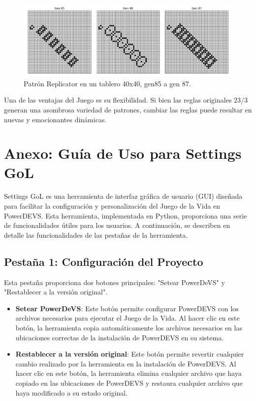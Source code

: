 \documentclass[]{article}
\begin{document}
\begin{figure}[H]
  \centering
  \includegraphics[width=1\textwidth]{../assets/special/replicator_2.png}
  \caption{Patrón Replicator en un tablero 40x40, gen85 a gen 87.}
  \label{fig:replicator_2}
  \end{figure}

Una de las ventajas del Juego es su flexibilidad. Si bien las reglas originales 23/3 generan una asombrosa variedad de patrones, cambiar las reglas puede resultar en nuevas y emocionantes dinámicas.


\section{Anexo: Guía de Uso para Settings GoL}

Settings GoL es una herramienta de interfaz gráfica de usuario (GUI) diseñada para facilitar la configuración y personalización del Juego de la Vida en PowerDEVS. Esta herramienta, implementada en Python, proporciona una serie de funcionalidades útiles para los usuarios. A continuación, se describen en detalle las funcionalidades de las pestañas de la herramienta.

\subsection{Pestaña 1: Configuración del Proyecto}

Esta pestaña proporciona dos botones principales: "Setear PowerDeVS" y "Restablecer a la versión original". 

\begin{itemize}
  \item \textbf{Setear PowerDeVS}: Este botón permite configurar PowerDEVS con los archivos necesarios para ejecutar el Juego de la Vida. Al hacer clic en este botón, la herramienta copia automáticamente los archivos necesarios en las ubicaciones correctas de la instalación de PowerDEVS en su sistema. 

  \item \textbf{Restablecer a la versión original}: Este botón permite revertir cualquier cambio realizado por la herramienta en la instalación de PowerDEVS. Al hacer clic en este botón, la herramienta elimina cualquier archivo que haya copiado en las ubicaciones de PowerDEVS y restaura cualquier archivo que haya modificado a su estado original.
\end{itemize}
\end{document}
